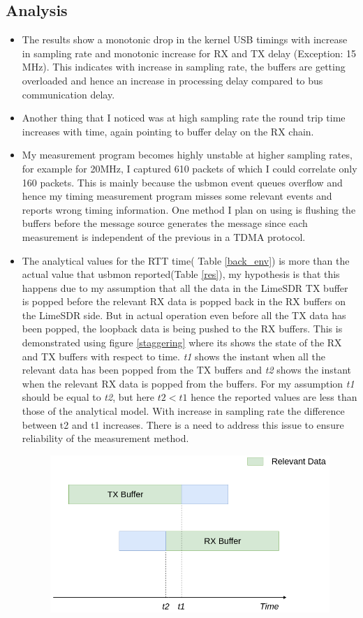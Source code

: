 \documentclass{kththesis}
\begin{document}
\subsection{Analysis}
\begin{itemize}
\item {The results show a monotonic drop in the kernel USB timings with increase in sampling rate and monotonic increase for RX and TX delay (Exception: 15 MHz). This indicates with increase in sampling rate, the buffers are getting overloaded and hence an increase in processing delay compared to bus communication delay.}
\item {Another thing that I noticed was at high sampling rate the round trip time increases with time, again pointing to buffer delay on the RX chain.}
\item {My measurement program becomes highly unstable at higher sampling rates, for example for 20MHz, I captured 610 packets of which I could correlate only 160 packets. This is mainly because the usbmon event queues overflow and hence my timing measurement program misses some relevant events and reports wrong timing information. One method I plan on using is flushing the buffers before the message source generates the message since each measurement is independent of the previous in a TDMA protocol.  }
\item {The analytical values for the RTT time( Table \ref{back_env}) is more than the actual value that usbmon reported(Table \ref{res}), my hypothesis is that this happens due to my assumption that all the data in the LimeSDR TX buffer is popped before the relevant RX data is popped back in the RX buffers on the LimeSDR side. But in actual operation even before all the TX data has been popped, the loopback data is being pushed to the RX buffers. This is demonstrated using figure \ref{staggering} where its shows the state of the RX and TX buffers with respect to time. \textit{t1} shows the instant when all the relevant data has been popped from the TX buffers and \textit{t2} shows the instant when the relevant RX data is popped from the buffers. For my assumption \textit{t1} should be equal to \textit{t2}, but here  $t2<t1$ hence the reported values are less than those of the analytical model. With increase in sampling rate the difference between t2 and t1 increases. There is a need to address this issue to ensure reliability of the measurement method.
\begin{figure}
\centering
\hspace{1cm}\includegraphics[scale=0.5]{Figure/Staggering.png}

\end{figure}}
\end{itemize}
\end{document}
